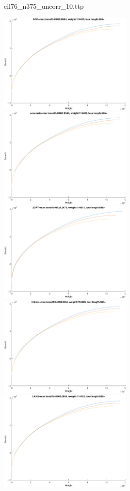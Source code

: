 \documentclass{article}
\begin{document}
\newpage
eil76\_n375\_uncorr\_10.ttp

\noindent
\includegraphics[width=0.5\textwidth]{eil76figs/eil76_n375_uncorr_10.ttp.aco.txt.atsf.eps}
\includegraphics[width=0.5\textwidth]{eil76figs/eil76_n375_uncorr_10.ttp.con.txt.atsf.eps}
\includegraphics[width=0.5\textwidth]{eil76figs/eil76_n375_uncorr_10.ttp.inv.txt.atsf.eps}
\includegraphics[width=0.5\textwidth]{eil76figs/eil76_n375_uncorr_10.ttp.lkh.txt.atsf.eps}
\includegraphics[width=0.5\textwidth]{eil76figs/eil76_n375_uncorr_10.ttp.lkh2.txt.atsf.eps}
\end{document}
